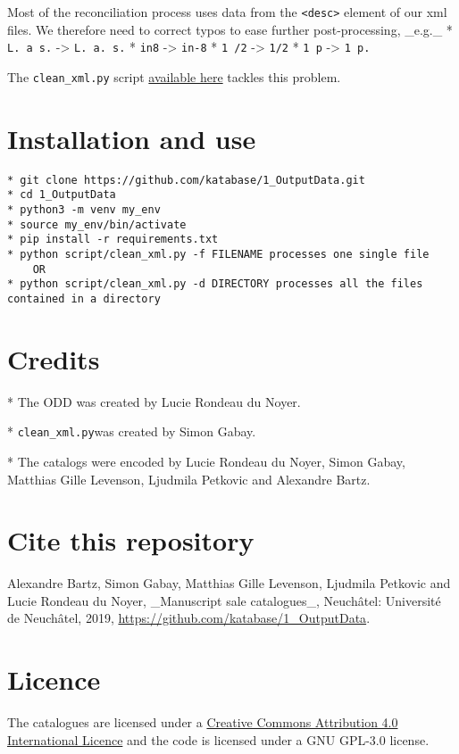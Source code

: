 Most of the reconciliation process uses data from the \texttt{<desc\textgreater{}} element of our xml files. We therefore need to correct typos to ease further post-processing, \_e.g.\_
  * \texttt{L. a s.} -\textgreater{} \texttt{L. a. s.}
  * \texttt{in8} -\textgreater{} \texttt{in-8}
  * \texttt{1 /2} -\textgreater{} \texttt{1/2}
  * \texttt{1 p} -\textgreater{} \texttt{1 p.}

The \texttt{clean\_xml.py} script \href{https://github.com/katabase/1\_OutputData/blob/master/script/clean\_xml.py}{available here} tackles this problem.
\section*{Installation and use}

\begin{listing}[h!]
   \begin{verbatim}
* git clone https://github.com/katabase/1_OutputData.git
* cd 1_OutputData
* python3 -m venv my_env
* source my_env/bin/activate
* pip install -r requirements.txt
* python script/clean_xml.py -f FILENAME processes one single file
	OR
* python script/clean_xml.py -d DIRECTORY processes all the files contained in a directory

   \end{verbatim}
\end{listing}
\section*{Credits}

* The ODD was created by Lucie Rondeau du Noyer.

* \texttt{clean\_xml.py}was created by Simon Gabay.

* The catalogs were encoded by Lucie Rondeau du Noyer, Simon Gabay, Matthias Gille Levenson, Ljudmila Petkovic and Alexandre Bartz.

\section*{Cite this repository}

Alexandre Bartz, Simon Gabay, Matthias Gille Levenson, Ljudmila Petkovic and Lucie Rondeau du Noyer, \_Manuscript sale catalogues\_, Neuchâtel: Université de Neuchâtel, 2019, \href{https://github.com/katabase/1\_OutputData}{https://github.com/katabase/1\_OutputData}.

\section*{Licence}

The catalogues are licensed under a \href{http://creativecommons.org/licenses/by/4.0/}{Creative Commons Attribution 4.0 International Licence} and the code is licensed under a GNU GPL-3.0 license.
